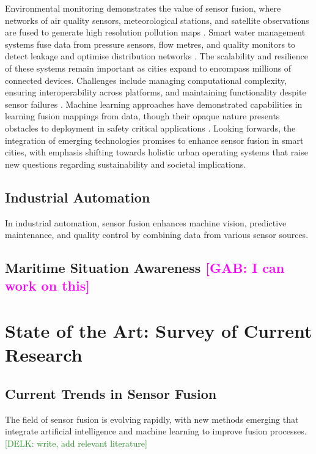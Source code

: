 \documentclass[journal]{IEEEtran}
\newcommand{\GO}[1]{\textcolor{magenta}{{#1}}}
\newcommand{\KD}[1]{\textcolor{ForestGreen}{{#1}}}
\begin{document}
Environmental monitoring demonstrates the value of sensor fusion, where networks of air quality sensors, meteorological stations, and satellite observations are fused to generate high resolution pollution maps \cite{zheng_diagnosing_2013}. Smart water management systems fuse data from pressure sensors, flow metres, and quality monitors to detect leakage and optimise distribution networks \cite{anumalla_review_2019}. The scalability and resilience of these systems remain important as cities expand to encompass millions of connected devices. Challenges include managing computational complexity, ensuring interoperability across platforms, and maintaining functionality despite sensor failures \cite{kimani_cyber_2019}. Machine learning approaches have demonstrated capabilities in learning fusion mappings from data, though their opaque nature presents obstacles to deployment in safety critical applications \cite{guo_deep_2019}. Looking forwards, the integration of emerging technologies promises to enhance sensor fusion in smart cities, with emphasis shifting towards holistic urban operating systems that raise new questions regarding sustainability and societal implications.

\subsection{Industrial Automation} 
In industrial automation, sensor fusion enhances machine vision, predictive maintenance, and quality control by combining data from various sensor sources.

\subsection{Maritime Situation Awareness \GO{[GAB: I can work on this]}} 

\section{State of the Art: Survey of Current Research}

\subsection{Current Trends in Sensor Fusion}
The field of sensor fusion is evolving rapidly, with new methods emerging that integrate artificial intelligence and machine learning to improve fusion processes.
\KD{[DELK: write, add relevant literature]}
\end{document}
